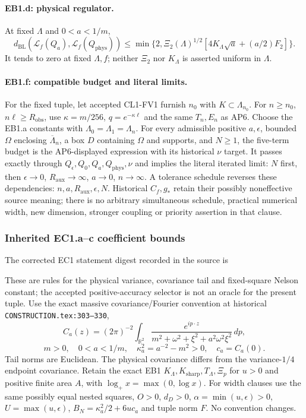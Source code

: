 \documentclass[11pt]{article}
\theoremstyle{plain}
\theoremstyle{definition}
\theoremstyle{remark}
\newcommand{\R}{\mathbb{R}}
\begin{document}
\paragraph{EB1.d: physical regulator.}
At fixed $\Lambda$ and $0<a<1/m$,
\[
 d_{\mathrm{BL}}(\mathcal L_f(Q_a),\mathcal L_f(Q_{\mathrm{phys}}))
 \le\min\{2,\Xi_2(\Lambda)^{1/2}[4K_\Lambda\sqrt a+(a/2)F_2]\}.
\]
It tends to zero at fixed $\Lambda,f$; neither $\Xi_2$ nor $K_\Lambda$
is asserted uniform in $\Lambda$.

\paragraph{EB1.f: compatible budget and literal limits.}
For the fixed tuple, let accepted CL1-FV1 furnish $n_0$ with
$K\subset\Lambda_{n_0}$. For $n\ge n_0$, $n\ell\ge R_{\mathrm{obs}}$,
use $\kappa=m/256$, $q=e^{-\kappa\ell}$ and the same $T_n,E_n$ as AP6.
Choose the EB1.a constants with $\Lambda_0=\Lambda_1=\Lambda_n$.
For every admissible positive $a,\epsilon$, bounded $\Omega$ enclosing
$\overline\Lambda_n$, a box $D$ containing $\Omega$ and supports, and
$N\ge1$, the five-term budget is the AP6-displayed expression with its
historical $\nu$ target. It passes exactly through
$Q_\epsilon,Q_0,Q_a,Q_{\mathrm{phys}},\nu$ and implies the literal
iterated limit: $N$ first, then $\epsilon\to0$, $R_{\mathrm{aux}}\to\infty$,
$a\to0$, $n\to\infty$. A tolerance schedule reverses these dependencies:
$n,a,R_{\mathrm{aux}},\epsilon,N$.
Historical $C_f,g_*$ retain their possibly noneffective source meaning;
there is no arbitrary simultaneous schedule, practical numerical width,
new dimension, stronger coupling or priority assertion in that clause.

\subsubsection{Inherited EC1.a--c coefficient bounds}
The corrected EC1 statement digest recorded in the source is
\par{}\par
These are rules for the physical variance, covariance tail and fixed-square
Nelson constant; the accepted positive-accuracy selector is not an oracle
for the present tuple. Use the exact massive covariance/Fourier convention
at historical \texttt{CONSTRUCTION.tex:303--330},
\[
 C_a(z)=(2\pi)^{-2}\int_{\R^2}
 \frac{e^{ip\cdot z}}{m^2+\omega^2+\xi^2+a^2\omega^2\xi^2}\,dp,
\]
\[m>0,\quad0<a<1/m,\quad\kappa_a^2=a^{-2}-m^2>0,\quad c_a=C_a(0).
\]
Tail norms are Euclidean. The physical covariance differs from the
variance-$1/4$ endpoint covariance. Retain the exact EB1
$K_\Lambda,K_{\mathrm{sharp}},T_\Lambda,\Xi_p$ for $u>0$ and positive
finite area $A$, with $\log_+x=\max(0,\log x)$.
For width clauses use the same possibly equal nested squares, $O>0$,
$d_D>0$, $\alpha=\min(u,\epsilon)>0$, $U=\max(u,\epsilon)$,
$B_N=\kappa_a^2/2+6uc_a$ and tuple norm $F$. No convention changes.
\end{document}
